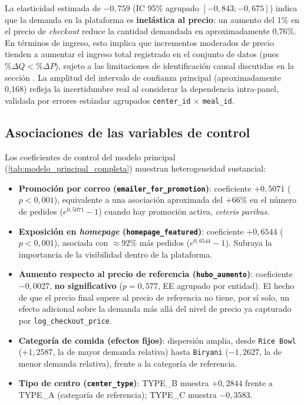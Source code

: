 \documentclass[doc, a4paper, biblatex, floatsintext, longtable, babel]{apa7}
\begin{document}
La elasticidad estimada de $-0,759$ (IC 95\% agrupado $[ -0,843; -0,675 ]$) indica que la demanda en la plataforma es \textbf{inel\'astica al precio}: un aumento del 1\% en el precio de \textit{checkout} reduce la cantidad demandada en aproximadamente 0,76\%. En t\'erminos de ingreso, esto implica que incrementos moderados de precio tienden a aumentar el ingreso total registrado en el conjunto de datos (pues $\%\Delta Q < \%\Delta P$), sujeto a las limitaciones de identificaci\'on causal discutidas en la secci\'on . La amplitud del intervalo de confianza principal (aproximadamente 0,168) refleja la incertidumbre real al considerar la dependencia intra-panel, validada por errores estándar agrupados \texttt{center\_id} $\times$ \texttt{meal\_id}.

\subsection{Asociaciones de las variables de control}
\label{subsec:controles}

Los coeficientes de control del modelo principal (\cref{tab:modelo_principal_completa}) muestran heterogeneidad sustancial:

\begin{itemize}
    \item \textbf{Promoci\'on por correo (\texttt{emailer\_for\_promotion})}: coeficiente $+0,5071$ ($p<0,001$), equivalente a una asociación aproximada del $+66\%$ en el n\'umero de pedidos ($e^{0,5071}-1$) cuando hay promoci\'on activa, \textit{ceteris paribus}.
    \item \textbf{Exposici\'on en \textit{homepage} (\texttt{homepage\_featured})}: coeficiente $+0,6544$ ($p<0,001$), asociada con $ \approx 92\%$ m\'as pedidos ($e^{0,6544}-1$). Subraya la importancia de la visibilidad dentro de la plataforma.
    \item \textbf{Aumento respecto al precio de referencia (\texttt{hubo\_aumento})}: coeficiente $-0,0027$, \textbf{no significativo} ($p=0,577$, EE agrupado por entidad). El hecho de que el precio final supere al precio de referencia no tiene, por s\'i solo, un efecto adicional sobre la demanda m\'as all\'a del nivel de precio ya capturado por \texttt{log\_checkout\_price}.
    \item \textbf{Categor\'ia de comida (efectos fijos)}: dispersi\'on amplia, desde \texttt{Rice Bowl} ($+1,2587$, la de mayor demanda relativa) hasta \texttt{Biryani} ($-1,2627$, la de menor demanda relativa), frente a la categor\'ia de referencia.
    \item \textbf{Tipo de centro (\texttt{center\_type})}: TYPE\_B muestra $+0,2844$ frente a TYPE\_A (categor\'ia de referencia); TYPE\_C muestra $-0,3583$.
\end{itemize}
\end{document}
